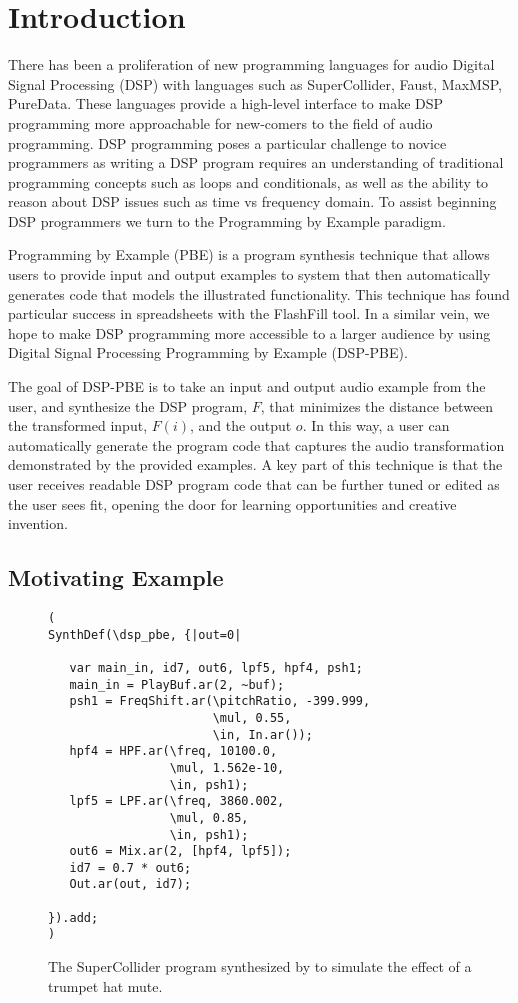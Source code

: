 
\section{Introduction}

There has been a proliferation of new programming languages for audio Digital Signal Processing (DSP) with languages such as SuperCollider, Faust, MaxMSP, PureData.
These languages provide a high-level interface to make DSP programming more approachable for new-comers to the field of audio programming.
DSP programming poses a particular challenge to novice programmers as writing a DSP program requires an understanding of traditional programming concepts such as loops and conditionals, as well as the ability to reason about DSP issues such as time vs frequency domain.
To assist beginning DSP programmers we turn to the Programming by Example paradigm.

Programming by Example (PBE) is a program synthesis technique that allows users to provide input and output examples to system that then automatically generates code that models the illustrated functionality.
This technique has found particular success in spreadsheets with the FlashFill tool.
In a similar vein, we hope to make DSP programming more accessible to a larger audience by using Digital Signal Processing Programming by Example (DSP-PBE).

The goal of DSP-PBE is to take an input and output audio example from the user, and synthesize the DSP program, $F$, that minimizes the distance between the transformed input, $F(i)$, and the output $o$.
In this way, a user can automatically generate the program code that captures the audio transformation demonstrated by the provided examples.
A key part of this technique is that the user receives readable DSP program code that can be further tuned or edited as the user sees fit, opening the door for learning opportunities and creative invention.


\subsection{Motivating Example}


\begin{figure}
\begin{lstlisting}
( 
SynthDef(\dsp_pbe, {|out=0|

   var main_in, id7, out6, lpf5, hpf4, psh1;
   main_in = PlayBuf.ar(2, ~buf);
   psh1 = FreqShift.ar(\pitchRatio, -399.999, 
                       \mul, 0.55, 
                       \in, In.ar());
   hpf4 = HPF.ar(\freq, 10100.0, 
                 \mul, 1.562e-10, 
                 \in, psh1);
   lpf5 = LPF.ar(\freq, 3860.002, 
                 \mul, 0.85, 
                 \in, psh1);
   out6 = Mix.ar(2, [hpf4, lpf5]);
   id7 = 0.7 * out6;
   Out.ar(out, id7);

}).add;
)
\end{lstlisting}
\caption{The SuperCollider program synthesized by \ourTool to simulate the effect of a trumpet hat mute.}
\label{fig:sc_code}
\end{figure}

